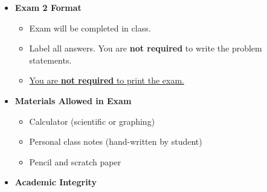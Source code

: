 \documentclass[11pt]{article}
\newcommand{\EXAMNUM}{2\hspace{0mm}}
\begin{document}
\begin{itemize}
             	\item  \textbf{\Large Exam \EXAMNUM \hspace{1mm} Format}
\begin{itemize}
		
			\item Exam will be completed in class.
			
			\item Label all answers. You are {\bf not required} to write the problem statements.
			\item \underline{You are {\bf not required} to print the exam.}
\end{itemize}


\vspace{5mm}		

		\item  \textbf{ Materials Allowed in Exam}

	\begin{itemize}

		\item  Calculator (scientific or graphing)
	
		\item  Personal class notes (hand-written by student)
			
		\item  Pencil and scratch paper
			
	\end{itemize}

\newpage
		\item  \textbf{ \Large Academic Integrity}
\begin{itemize}


\end{itemize}
\end{itemize}
\end{document}
